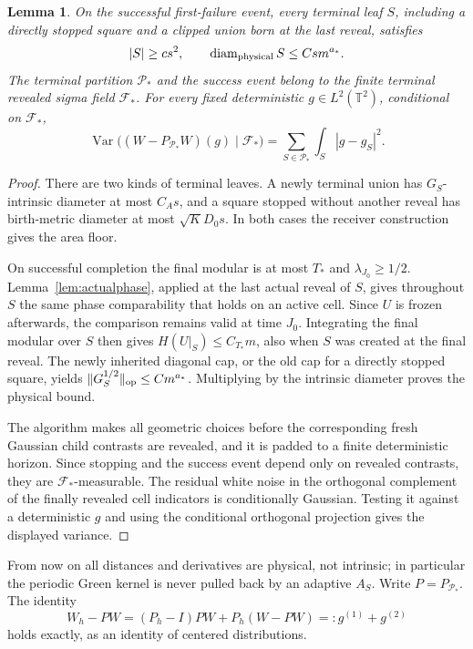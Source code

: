 \documentclass[11pt]{article}
\newtheorem{lemma}[lemma]{Lemma}
\theoremstyle{definition}
\theoremstyle{remark}
\numberwithin{equation}{section}
\newcommand{\T}{\mathbb T}
\newcommand{\F}{\mathcal F}
\newcommand{\pr}{\mathcal P}
\begin{document}
\begin{lemma}
\label{lem:terminalhistory}
On the successful first-failure event, every terminal leaf $S$,
including a directly stopped square and a clipped union born at the
last reveal, satisfies
\[
 |S|\ge cs^2,\qquad
 \operatorname{diam}_{\rm physical}S\le Csm^{a_*}.
\]
The terminal partition $\pr_*$ and the success event belong to the
finite terminal revealed sigma field $\F_*$.  For every fixed
deterministic $g\in L^2(\T^2)$, conditional on $\F_*$,
\[
 \operatorname{Var}\bigl((W-P_{\pr_*}W)(g)\mid\F_*\bigr)
 =\sum_{S\in\pr_*}\int_S|g-g_S|^2.
\]
\end{lemma}
\begin{proof}
There are two kinds of terminal leaves. A newly terminal union has
$G_S$-intrinsic diameter at most $C_As$, and a square stopped without
another reveal has birth-metric diameter at most $\sqrt K D_0s$. In
both cases the receiver construction gives the area floor.

On successful completion the final modular is at most $T_*$ and
$\lambda_{J_0}\ge1/2$. Lemma~\ref{lem:actualphase}, applied at
the last actual reveal of $S$, gives throughout $S$ the same phase
comparability that holds on an active cell. Since $U$ is frozen
afterwards, the comparison remains valid at time $J_0$. Integrating
the final modular over $S$ then gives $H(U|_S)\le C_{T_*}m$, also
when $S$ was created at the final reveal. The newly inherited diagonal
cap, or the old cap for a directly stopped square, yields
$\|G_S^{1/2}\|_{\rm op}\le C m^{a_*}$. Multiplying by the intrinsic
diameter proves the physical bound.

The algorithm makes all geometric choices before the corresponding
fresh Gaussian child contrasts are revealed, and it is padded to a
finite deterministic horizon. Since stopping and the success event
depend only on revealed contrasts, they are $\F_*$-measurable. The
residual white noise in the orthogonal complement of the finally
revealed cell indicators is conditionally Gaussian. Testing it against
a deterministic $g$ and using the conditional orthogonal projection
gives the displayed variance.
\end{proof}

From now on all distances and derivatives are physical, not
intrinsic; in particular the periodic Green kernel is never pulled
back by an adaptive $A_S$. Write $P=P_{\pr_*}$. The identity
\begin{equation}\label{eq:decomp}
 W_h-PW=(P_h-I)PW+P_h(W-PW)=:g^{(1)}+g^{(2)}
\end{equation}
holds exactly, as an identity of centered distributions.
\end{document}
